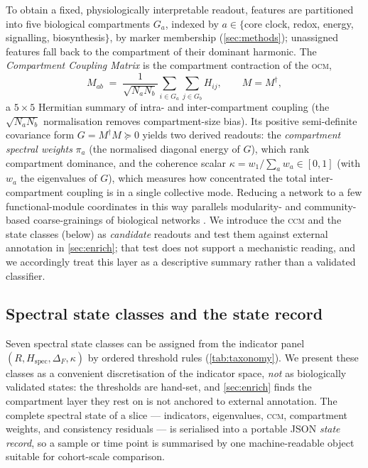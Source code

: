 \documentclass[preprint,12pt,amsmath,amssymb,superscriptaddress,floatfix]{revtex4-2}
\theoremstyle{definition}
\theoremstyle{plain}
\newcommand{\OCM}{\textsc{ocm}}
\newcommand{\CCM}{\textsc{ccm}}
\newcommand{\Hspec}{H_{\mathrm{spec}}}
\begin{document}
To obtain a fixed, physiologically interpretable readout, features are
partitioned into five biological compartments $G_a$, indexed by $a\in\{$core
clock, redox, energy, signalling, biosynthesis$\}$, by marker membership
(\cref{sec:methods}); unassigned features fall back to the compartment of their
dominant harmonic. The \emph{Compartment Coupling Matrix} is the compartment contraction
of the \OCM,
\begin{equation}
  M_{ab} \;=\; \frac{1}{\sqrt{N_a N_b}}
    \sum_{i\in G_a}\sum_{j\in G_b} H_{ij},
  \qquad M = M^{\dagger},
  \label{eq:ost}
\end{equation}
a $5\times5$ Hermitian summary of intra- and inter-compartment coupling
(the $\sqrt{N_aN_b}$ normalisation removes compartment-size bias). Its positive
semi-definite covariance form $G = M^{\dagger}M \succeq 0$ yields two derived
readouts: the \emph{compartment spectral weights} $\pi_a$ (the normalised diagonal
energy of $G$), which rank compartment dominance, and the coherence scalar
$\kappa = w_1/\sum_a w_a \in[0,1]$ (with $w_a$ the eigenvalues of $G$), which
measures how concentrated the total inter-compartment coupling is in a single
collective mode. Reducing a network to a few functional-module coordinates in this
way parallels modularity- and community-based coarse-grainings of biological
networks \citep{newman2006modularity, barabasi2011network}. We introduce the \CCM{}
and the state classes (below) as \emph{candidate} readouts and test them against
external annotation in \cref{sec:enrich}; that test does not support a mechanistic
reading, and we accordingly treat this layer as a descriptive summary rather than
a validated classifier.

\subsection{Spectral state classes and the state record}
\label{sec:theory-taxonomy}

Seven spectral state classes can be assigned from the indicator
panel $(R,\Hspec,\Delta_F,\kappa)$ by ordered threshold rules
(\cref{tab:taxonomy}). We present these classes as a convenient discretisation of
the indicator space, \emph{not} as biologically validated states: the thresholds
are hand-set, and \cref{sec:enrich} finds the compartment layer they rest on is
not anchored to external annotation. The complete spectral state of a slice ---
indicators, eigenvalues, \CCM, compartment weights, and consistency residuals ---
is serialised into a portable JSON \emph{state record}, so a sample or time point
is summarised by one machine-readable object suitable for cohort-scale comparison.
\end{document}
